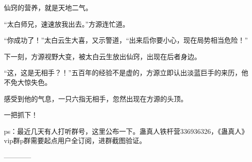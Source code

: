 \begin{this_body}
仙窍的营养，就是天地二气。

“太白师兄，速速放我出去。”方源连忙道。

“你成功了！”太白云生大喜，又示警道，“出来后你要小心，现在局势相当危险！”

下一刻，方源视野大变，被太白云生放出仙窍，出现在后者身边。

“这，这是无相手？！”五百年的经验不是虚的，方源立即认出淡蓝巨手的来历，他不免大惊失色。

感受到他的气息，一只六指无相手，忽然出现在方源的头顶。

一把抓下！

ps：最近几天有人打听群号，这里公布一下。蛊真人铁杆营336936326，《蛊真人》vip群p群需要起点用户全订阅，进群截图验证。

------------

\end{this_body}

